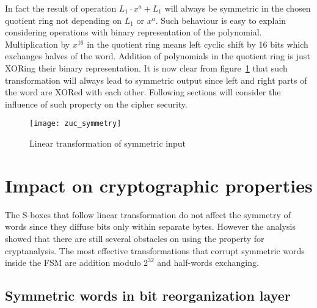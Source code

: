 In fact the result of operation $L_1 \cdot x^a + L_1$ will always be symmetric in the chosen
quotient ring not depending on $L_1$ or $x^a$. Such behaviour is easy to explain
considering operations with binary representation of the polynomial.
Multiplication by $x^{16}$ in the quotient ring means left cyclic shift by 16 bits
which exchanges halves of the word. Addition of polynomials in  the quotient
ring is just XORing their binary representation. It is now clear from
figure~\ref{fig:zuc-symmetry}
that such transformation will always lead to symmetric output since left and
right parts of the word are XORed with each other. Following sections will
consider the influence of such property on the cipher security. 
\begin{figure}[htbp]
	\centering
	\texttt{[image: zuc\_symmetry]}
	\caption{Linear transformation of symmetric input}
	\label{fig:zuc-symmetry}
\end{figure}

\section{Impact on cryptographic properties}

The S-boxes that follow linear transformation do not affect the symmetry of
words since they diffuse bits only within separate bytes. However the analysis
showed that there are still several obstacles on using the property for
cryptanalysis. The most effective transformations that corrupt symmetric words
inside the FSM are addition modulo $2^{32}$ and half-words exchanging.

\subsection{Symmetric words in bit reorganization layer}

